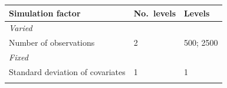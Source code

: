 \documentclass[10,a4paperpaper,]{article}
\begin{document}
\begin{longtable}[]{@{}lll@{}}
\toprule
\begin{minipage}[b]{0.37\columnwidth}\raggedright
Simulation factor\strut
\end{minipage} & \begin{minipage}[b]{0.12\columnwidth}\raggedright
No.~levels\strut
\end{minipage} & \begin{minipage}[b]{0.43\columnwidth}\raggedright
Levels\strut
\end{minipage}\tabularnewline
\midrule
\endhead
\begin{minipage}[t]{0.37\columnwidth}\raggedright
\emph{Varied}\strut
\end{minipage} & \begin{minipage}[t]{0.12\columnwidth}\raggedright
\strut
\end{minipage} & \begin{minipage}[t]{0.43\columnwidth}\raggedright
\strut
\end{minipage}\tabularnewline
\begin{minipage}[t]{0.37\columnwidth}\raggedright
Number of observations\strut
\end{minipage} & \begin{minipage}[t]{0.12\columnwidth}\raggedright
2\strut
\end{minipage} & \begin{minipage}[t]{0.43\columnwidth}\raggedright
500; 2500\strut
\end{minipage}\tabularnewline
\begin{minipage}[t]{0.37\columnwidth}\raggedright
\emph{Fixed}\strut
\end{minipage} & \begin{minipage}[t]{0.12\columnwidth}\raggedright
\strut
\end{minipage} & \begin{minipage}[t]{0.43\columnwidth}\raggedright
\strut
\end{minipage}\tabularnewline
\begin{minipage}[t]{0.37\columnwidth}\raggedright
Standard deviation of covariates\strut
\end{minipage} & \begin{minipage}[t]{0.12\columnwidth}\raggedright
1\strut
\end{minipage} & \begin{minipage}[t]{0.43\columnwidth}\raggedright
1\strut
\end{minipage}\tabularnewline
\begin{minipage}[t]{0.37\columnwidth}\raggedright

\end{minipage}
\end{longtable}
\end{document}
